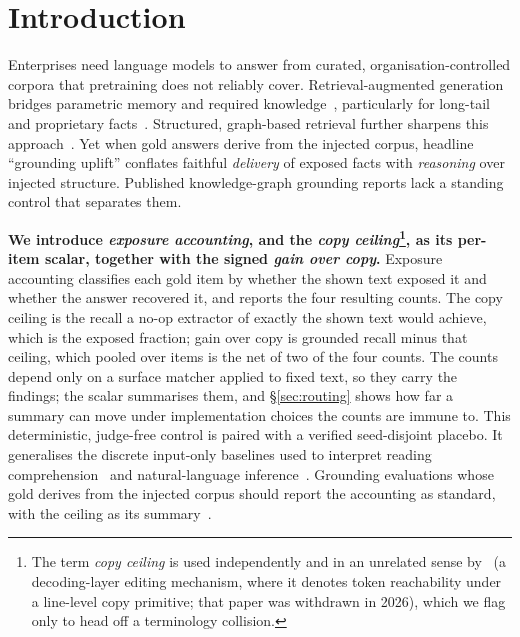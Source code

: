 \documentclass[10pt,twocolumn]{article}
\begin{document}
\section{Introduction}\label{sec:intro}
Enterprises need language models to answer from curated, organisation-controlled corpora that pretraining does not reliably cover. Retrieval-augmented generation bridges parametric memory and required knowledge~\cite{lewis2020rag,gao2023ragsurvey}, particularly for long-tail and proprietary facts~\cite{mallen2023trust}. Structured, graph-based retrieval further sharpens this approach~\cite{edge2024graphrag,guo2024lightrag,baek2023kaping,pan2024unifying}. Yet when gold answers derive from the injected corpus, headline ``grounding uplift'' conflates faithful \emph{delivery} of exposed facts with \emph{reasoning} over injected structure. Published knowledge-graph grounding reports lack a standing control that separates them.

\textbf{We introduce \emph{exposure accounting}, and the \emph{copy ceiling}\footnote{The term \emph{copy ceiling} is used independently and in an unrelated sense by~\textcite{copyasdecode2026} (a decoding-layer editing mechanism, where it denotes token reachability under a line-level copy primitive; that paper was withdrawn in 2026), which we flag only to head off a terminology collision.}, as its per-item scalar, together with the signed \emph{gain over copy}.} Exposure accounting classifies each gold item by whether the shown text exposed it and whether the answer recovered it, and reports the four resulting counts. The copy ceiling is the recall a no-op extractor of exactly the shown text would achieve, which is the exposed fraction; gain over copy is grounded recall minus that ceiling, which pooled over items is the net of two of the four counts. The counts depend only on a surface matcher applied to fixed text, so they carry the findings; the scalar summarises them, and \S\ref{sec:routing} shows how far a summary can move under implementation choices the counts are immune to. This deterministic, judge-free control is paired with a verified seed-disjoint placebo. It generalises the discrete input-only baselines used to interpret reading comprehension~\cite{kaushik2018reading} and natural-language inference~\cite{gururangan2018artifacts,poliak2018hypothesis}. Grounding evaluations whose gold derives from the injected corpus should report the accounting as standard, with the ceiling as its summary~\cite{laitenberger2025stronger,min2023factscore}.
\end{document}

